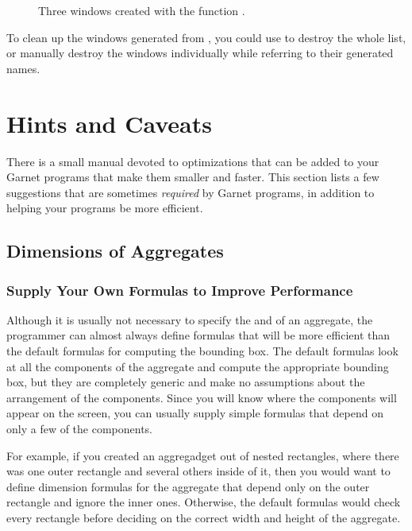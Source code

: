 \begin{figure}
\begin{center}
\end{center}
\caption{Three windows created with the function .}
\end{figure}

To clean up the windows generated from , you could use
 to destroy the whole list, or manually destroy the windows
individually while referring to their generated names.



\chapter{Hints and Caveats}

There is a small manual devoted to optimizations that can be added to your
Garnet programs that make them smaller and faster.  This section lists a
few suggestions that are sometimes {\it required} by Garnet programs, in
addition to helping your programs be more efficient.


\section{Dimensions of Aggregates}

\subsection{Supply Your Own Formulas to Improve Performance}

Although it is usually not necessary to specify the  and
 of an aggregate, the programmer can almost always define
formulas that will be more efficient than the default formulas for
computing the bounding box.  The default formulas look at all the
components of the aggregate and compute the appropriate bounding box, but
they are completely generic and make no assumptions about the arrangement
of the components.  Since you will know where the components will
appear on the screen, you can usually supply simple formulas that
depend on only a few of the components.

For example, if you created an aggregadget out of nested rectangles,
where there was one outer rectangle and several others inside of it,
then you would want to define dimension formulas for the aggregate that
depend only on the outer rectangle and ignore the inner ones.
Otherwise, the default formulas would check every rectangle before
deciding on the correct width and height of the aggregate.


